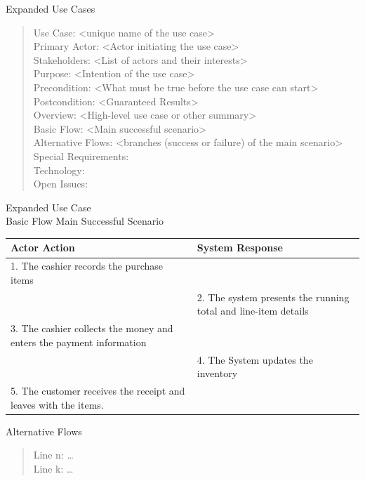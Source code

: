 \documentclass[10pt,t,a4paper]{beamer}
\begin{document}
\begin{frame}[label=sec-1-7]{Expanded Use Cases}
\begin{verse}
Use Case: <unique name of the use case> \\
Primary Actor: <Actor initiating the use case> \\
Stakeholders: <List of actors and their interests> \\
Purpose: <Intention of the use case> \\
\vspace*{1em}
Precondition: <What must be true before the use case can start> \\
Postcondition: <Guaranteed Results> \\
Overview: <High-level use case or other summary> \\
\vspace*{1em}
Basic Flow: <Main successful scenario> \\
Alternative Flows: <branches (success or failure) of the main scenario> \\
\vspace*{1em}
Special Requirements: \\
Technology: \\
Open Issues: \\
\end{verse}
\end{frame}
\begin{frame}[label=sec-1-8]{Expanded Use Case \\ Basic Flow}
Main Successful Scenario
\begin{center}
\begin{tabular}{p{5cm}p{5cm}}
Actor Action & System Response\\
\hline
1. The cashier records the purchase items & \\
 & 2. The system presents the running total and line-item details\\
3. The cashier collects the money and enters the payment information & \\
 & 4. The System updates the inventory\\
5. The customer receives the receipt and leaves with the items. & \\
\end{tabular}
\end{center}

Alternative Flows
\begin{verse}
Line n: \ldots{} \\
Line k: \ldots{} \\
\end{verse}
\end{frame}
\end{document}

